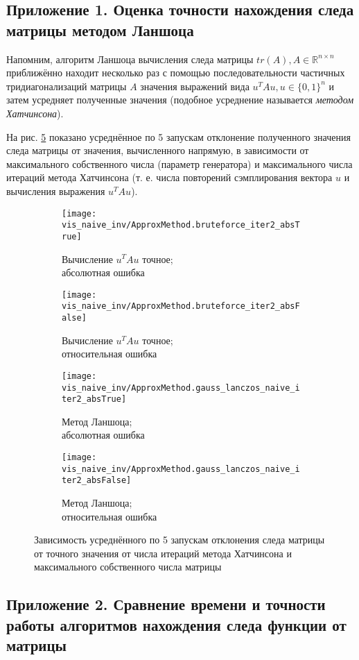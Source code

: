 \subsection{Приложение 1. Оценка точности нахождения следа матрицы методом Ланшоца }

Напомним, алгоритм Ланшоца вычисления следа матрицы $ tr(A), A \in \mathds R^{n \times n} $ приближённо находит несколько раз с помощью последовательности частичных тридиагонализаций матрицы $A$ значения выражений вида $ u^T Au, u \in \{0, 1\} ^n $ и затем усредняет полученные значения (подобное усреднение называется \emph{методом Хатчинсона}).

На рис. \ref{fig:trace_deviation} показано усреднённое по 5 запускам отклонение полученного значения следа матрицы от значения, вычисленного напрямую, в зависимости от максимального собственного числа (параметр генератора) и максимального числа итераций метода Хатчинсона (т. е. числа повторений сэмплирования вектора $ u $ и вычисления выражения $ u^T A u $).

\begin{figure}[H]
    \captionsetup[subfigure]{justification=centering}
    \centering
    \begin{subfigure}{.5\textwidth}
        \centering
        \texttt{[image: vis\_naive\_inv/ApproxMethod.bruteforce\_iter2\_absTrue]}
        \caption{Вычисление $ u^TAu $ точное; \\ абсолютная ошибка}
        \label{fig:trdev_brut_abs}
    \end{subfigure}%
    \begin{subfigure}{.5\textwidth}
        \centering
        \texttt{[image: vis\_naive\_inv/ApproxMethod.bruteforce\_iter2\_absFalse]}
        \caption{Вычисление $ u^TAu $ точное; \\ относительная ошибка}
        \label{fig:trdev_brut_rel}
    \end{subfigure}

    \begin{subfigure}{.5\textwidth}
        \centering
        \texttt{[image: vis\_naive\_inv/ApproxMethod.gauss\_lanczos\_naive\_iter2\_absTrue]}
        \caption{Метод Ланшоца; \\ абсолютная ошибка}
        \label{fig:trdev_lanc_abs}
    \end{subfigure}%
    \begin{subfigure}{.5\textwidth}
        \centering
        \texttt{[image: vis\_naive\_inv/ApproxMethod.gauss\_lanczos\_naive\_iter2\_absFalse]}
        \caption{Метод Ланшоца; \\ относительная ошибка}
        \label{fig:trdev_lanc_rel}
    \end{subfigure}
    \caption{ Зависимость усреднённого по 5 запускам отклонения следа матрицы от точного значения от числа итераций метода Хатчинсона и максимального собственного числа матрицы }
    \label{fig:trace_deviation}
\end{figure}

\newpage
\subsection{Приложение 2. Сравнение времени и точности работы алгоритмов нахождения следа функции от матрицы }
\label{appendix:benchmark}


